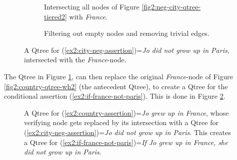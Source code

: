 \begin{figure}[H]
	\centering
	\begin{subfigure}[t]{\linewidth}
		\centering
	\caption{Intersecting all nodes of Figure \ref{fig2:neg-city-qtree-tiered2} with \textit{France}.}
	\end{subfigure}
	\begin{subfigure}[t]{\linewidth}
		\centering
		\caption{Filtering out empty nodes and removing trivial edges.}
	\end{subfigure}
	\caption{A Qtree for (\ref{ex2:city-neg-assertion})=\textit{Jo did not grow up in Paris}, intersected with the \textit{France}-node.}\label{fig2:neg-city-qtree-tiered-inter-france}
\end{figure}

The Qtree in Figure \ref{fig2:neg-city-qtree-tiered-inter-france}, can then replace the original \textit{France}-node of Figure \ref{fig2:country-qtree-wh2} (the antecedent Qtree), to create a Qtree for the conditional assertion (\ref{ex2:if-france-not-paris}). This is done in Figure \ref{fig2:qtree-if-france-then-not-paris}.

\begin{figure}[H]
	\centering
	\caption{A Qtree for (\ref{ex2:country-assertion})=\textit{Jo grew up in France}, whose verifying node gets replaced by its intersection with a Qtree for  (\ref{ex2:city-neg-assertion})=\textit{Jo did not grow up in Paris}. This creates a Qtree for (\ref{ex2:if-france-not-paris})=\textit{If Jo grew up in France, she did not grow up in Paris}. }\label{fig2:qtree-if-france-then-not-paris}
\end{figure}


